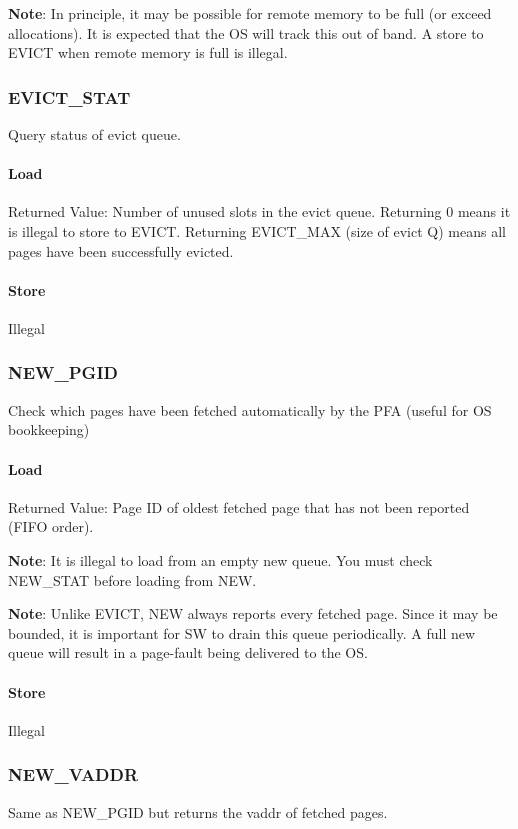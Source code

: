 \noindent
\textbf{Note}: In principle, it may be possible for remote memory to be full (or
exceed allocations). It is expected that the OS will track this out of band. A
store to EVICT when remote memory is full is illegal.

\subsubsection{EVICT\_STAT}
Query status of evict queue.

\paragraph{Load}
Returned Value: Number of unused slots in the evict queue. Returning 0 means it
is illegal to store to EVICT. Returning EVICT\_MAX (size of evict Q) means all
pages have been successfully evicted.

\paragraph{Store}
Illegal

\subsubsection{NEW\_PGID}
Check which pages have been fetched automatically by the PFA (useful for OS
bookkeeping)

\paragraph{Load}
Returned Value: Page ID of oldest fetched page that has not been reported (FIFO
order).

\noindent
\textbf{Note}: It is illegal to load from an empty new queue. You must check
NEW\_STAT before loading from NEW.

\noindent
\textbf{Note}: Unlike EVICT, NEW always reports every fetched page. Since it may be
bounded, it is important for SW to drain this queue periodically. A full new
queue will result in a page-fault being delivered to the OS.

\paragraph{Store}
Illegal

\subsubsection{NEW\_VADDR}
Same as NEW\_PGID but returns the vaddr of fetched pages.

